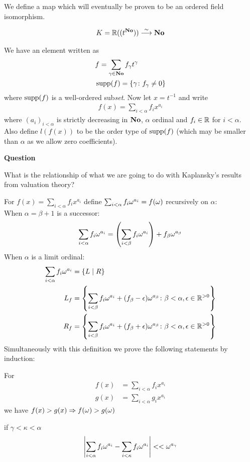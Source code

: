 
We define a map which will eventually be proven to be an ordered field isomorphism.

\begin{align*}
  K = \mathbb{R}((t^{\mathbf{No}})) \overset{\sim}{\longrightarrow} \mathbf{No}
\end{align*}

We have an element written as 
\begin{align*}
	&f = \sum_{\gamma \in \mathbf{No}} f_\gamma t^\gamma \\
	&\operatorname{supp}(f) = \{\gamma \colon f_\gamma \neq 0\}
\end{align*}
where $\operatorname{supp}(f)$ is a well-ordered sub\emph{set}. Now let $x = t^{-1}$ and write
\begin{align*}
  f(x) = \sum_{i < \alpha} f_i x^{a_i}
\end{align*}
where $(a_i)_{i<\alpha}$ is strictly decreasing in $\mathbf{No}$, $\alpha$ ordinal and $f_i \in \mathbb{R}$ for $i < \alpha$. Also define $l(f(x))$ to be the order type of $\operatorname{supp}(f)$ (which may be smaller than $\alpha$ as we allow zero coefficients).

\textbf{Question}

What is the relationship of what we are going to do with Kaplansky's results from valuation theory?

\begin{theorem} %
For $f(x) = \sum_{i < \alpha} f_i x^{a_i}$ define $\sum_{i < \alpha} f_i \omega^{a_i} = f(\omega)$ recursively on $\alpha$: \\ 
When $\alpha = \beta + 1$ is a successor:
\begin{align*}
	\sum_{i < \alpha} f_i \omega^{a_i} = \left( \sum_{i < \beta} f_i \omega^{a_i} \right) + f_\beta \omega^{a_\beta}
\end{align*}
When $\alpha$ is a limit ordinal:
\begin{align*}
	\sum_{i < \alpha} f_i \omega^{a_i} &= \left\{ L \mid R \right\} \\
  L_f &= \left\{ \sum_{i < \beta} f_i \omega^{a_i} + (f_\beta - \epsilon) \omega^{a_\beta}
	\colon \beta < \alpha, \epsilon \in \mathbb{R}^{>0} \right\} \\
  R_f &= \left\{ \sum_{i < \beta} f_i \omega^{a_i} + (f_\beta + \epsilon) \omega^{a_\beta}
	\colon \beta < \alpha, \epsilon \in \mathbb{R}^{>0} \right\}
\end{align*}
Simultaneously with this definition we prove the following statements by induction:

For \begin{align*}
	f(x) &= \sum_{i < \alpha} f_i x^{a_i} \\
	g(x) &= \sum_{i < \alpha} g_i x^{a_i}
\end{align*} we have $f(x) > g(x) \Rightarrow f(\omega) > g(\omega)$

 if $\gamma < \kappa < \alpha$
\begin{align*}
	\left| \sum_{i < \alpha} f_i \omega^{a_i} - \sum_{i < \kappa} f_i \omega^{a_i} \right| << \omega^{a_\gamma}
\end{align*}
\end{theorem}

